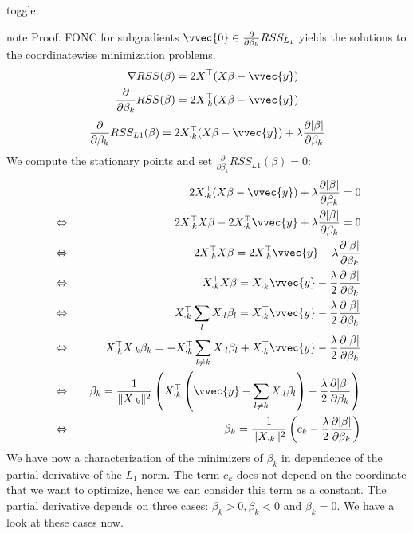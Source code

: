 \documentclass[letterpaper,10pt,english]{jupyterBook}
\begin{document}
\begin{sphinxuseclass}{toggle}
\begin{sphinxadmonition}{note}
\sphinxAtStartPar
Proof. FONC for subgradients \(\vvec{0}\in \frac{\partial }{\partial \beta_k}RSS_{L_1}\) yields the solutions to the coordinate\sphinxhyphen{}wise minimization problems.
\label{equation:regression_lasso:dffd1ef9-3065-45eb-8a01-087873f68713}\begin{align}
\nabla RSS(\beta) &= 2X^\top(X\beta-\vvec{y})\\
\frac{\partial}{\partial \beta_k} RSS(\beta) &= 2X_{\cdot k}^\top(X\beta-\vvec{y})
\end{align}\label{equation:regression_lasso:37ef83ed-8888-4e1e-af03-e185a03b24ac}\begin{align}
\frac{\partial}{\partial \beta_k} RSS_{L1}(\beta) = 2X_{\cdot k}^\top(X\beta-\vvec{y}) + \lambda\frac{\partial\lvert\beta\rvert}{\partial \beta_k}
\end{align}
\sphinxAtStartPar
We compute the stationary points and set \(\frac{\partial}{\partial \beta_k} RSS_{L1}(\beta)=0\):
\label{equation:regression_lasso:a4bf4c57-5a59-40c8-9ae4-6301aa440d1c}\begin{align}
&& 2X_{\cdot k}^\top(X\beta-\vvec{y}) + \lambda\frac{\partial\lvert\beta\rvert}{\partial \beta_k} = 0\\
&\Leftrightarrow\quad & 2X_{\cdot k}^\top X\beta - 2X_{\cdot k}^\top\vvec{y} + \lambda\frac{\partial\lvert\beta\rvert}{\partial \beta_k} = 0\\
&\Leftrightarrow & 2X_{\cdot k}^\top X\beta = 2X_{\cdot k}^\top\vvec{y} - \lambda\frac{\partial\lvert\beta\rvert}{\partial \beta_k}\\
&\Leftrightarrow & X_{\cdot k}^\top X\beta = X_{\cdot k}^\top\vvec{y} - \frac \lambda 2\frac{\partial\lvert\beta\rvert}{\partial \beta_k}\\
&\Leftrightarrow & X_{\cdot k}^\top \sum_{l} X_{\cdot l}\beta_l = X_{\cdot k}^\top\vvec{y} - \frac \lambda 2\frac{\partial\lvert\beta\rvert}{\partial \beta_k}\\
&\Leftrightarrow & X_{\cdot k}^\top X_{\cdot k}\beta_k = - X_{\cdot k}^\top \sum_{l\neq k} X_{\cdot l}\beta_l + X_{\cdot k}^\top\vvec{y} - \frac \lambda 2\frac{\partial\lvert\beta\rvert}{\partial \beta_k}\\
&\Leftrightarrow & \beta_k = \frac{1}{\lVert X_{\cdot k}\rVert^2}\left(X_{\cdot k}^\top\left(\vvec{y} -  \sum_{l\neq k} X_{\cdot l}\beta_l \right) - \frac \lambda 2\frac{\partial\lvert\beta\rvert}{\partial \beta_k}\right)\\
&\Leftrightarrow & \beta_k = \frac{1}{\lVert X_{\cdot k}\rVert^2}\left(c_k - \frac \lambda 2\frac{\partial\lvert\beta\rvert}{\partial \beta_k}\right)\\
\end{align}
\sphinxAtStartPar
We have now a characterization of the minimizers of \(\beta_k\) in dependence of the partial derivative of the \(L_1\) norm. The term \(c_k\) does not depend on the coordinate that we want to optimize, hence we can consider this term as a constant. The partial derivative depends on three cases: \(\beta_k>0, \beta_k<0\) and \(\beta_k=0\). We have a look at these cases now.


\end{sphinxadmonition}
\end{sphinxuseclass}
\end{document}
